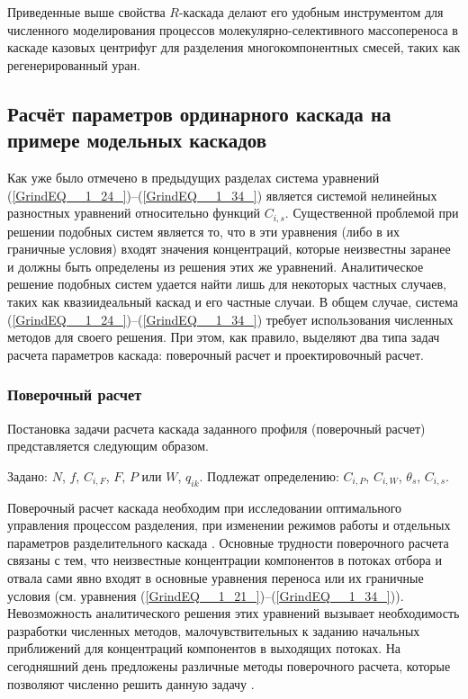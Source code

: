 Приведенные выше свойства $R$-каскада делают его удобным инструментом для численного моделирования процессов молекулярно-селективного массопереноса в каскаде казовых центрифуг для разделения многокомпонентных смесей, таких как регенерированный уран.

\subsection{Расчёт параметров ординарного каскада на примере модельных каскадов}\label{part2_discrep}

Как уже было отмечено в предыдущих разделах система уравнений (\ref{GrindEQ__1_24_})--(\ref{GrindEQ__1_34_}) является системой нелинейных разностных уравнений относительно функций $C_{i,s}$. Существенной проблемой при решении подобных систем является то, что в эти уравнения (либо в их граничные условия) входят значения концентраций, которые неизвестны заранее и должны быть определены из решения этих же уравнений. Аналитическое решение подобных систем удается найти лишь для некоторых частных случаев, таких как квазиидеальный каскад и его частные случаи. В общем случае, система (\ref{GrindEQ__1_24_})--(\ref{GrindEQ__1_34_}) требует использования численных методов для своего решения. При этом, как правило, выделяют два типа задач расчета параметров каскада: поверочный расчет и проектировочный расчет.

\subsubsection{Поверочный расчет}
Постановка задачи расчета каскада заданного профиля (поверочный расчет) представляется следующим образом.

Задано: $N$, $f$, $C_{i,F}$, $F$, $P$ или $W$, $q_{ik}$.
Подлежат определению: $C_{i,P}$, $C_{i,W}$, $\theta_{s}$, $C_{i, s}$. 

Поверочный расчет каскада необходим при исследовании оптимального управления процессом разделения, при изменении режимов работы и отдельных параметров разделительного каскада \cite{sulaberidzeTeoriyaKaskadovDlya2011}. Основные трудности поверочного расчета связаны с тем, что неизвестные концентрации компонентов в потоках отбора и отвала сами явно входят в основные уравнения переноса или их граничные условия (см. уравнения (\ref{GrindEQ__1_21_})--(\ref{GrindEQ__1_34_})). Невозможность аналитического решения этих уравнений вызывает необходимость разработки численных методов, малочувствительных к заданию начальных приближений для концентраций компонентов в выходящих потоках. На сегодняшний день предложены различные методы поверочного расчета, которые позволяют численно решить данную задачу \cite{sulaberidzeTeoriyaKaskadovDlya2011, sazykinUsovershenstvovannyyMetodRascheta1997, wuCalculationMethodsDetermining1988, holpanovEffektivnyyMetodRascheta1998, potapovCalculationSquaredoffCascades1996, zengRobustEfficientCalculation2000}.

